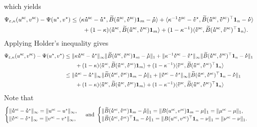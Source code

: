 which yields 
\begin{align*}
\Psi_{\varepsilon, \kappa} (u^{\text{sc}} ,v^{\text{sc}}) -\Psi(u^\star, v^\star)
&\leq  \inr{\kappa \dt{u}^{\text{sc}} - \dt{u}^{\star}, \widetilde{B}(\dt{u}^{\text{sc}} ,\dt{v}^{\text{sc}})\mathbf 1_m - \dt{\mu}} +\inr{\kappa^{-1}\dt{v}^{\text{sc}} - \dt{v}^{\star}, \widetilde{B}(\dt{u}^{\text{sc}} ,\dt{v}^{\text{sc}})^\top\mathbf 1_n - \dt{\nu}}\\
&\qquad + (1- \kappa)\inr{\dt{u}^{\text{sc}} ,\widetilde{B}(\dt{u}^{\text{sc}} ,\dt{v}^{\text{sc}})\mathbf 1_m} + (1- \kappa^{-1})\inr{\dt{v}^{\text{sc}} ,\widetilde{B}(\dt{u}^{\text{sc}} ,\dt{v}^{\text{sc}})^\top\mathbf 1_n}.
\end{align*}
Applying Holder's inequality gives 
\begin{align*}
\Psi_{\varepsilon, \kappa}(u^{\text{sc}} ,v^{\text{sc}}) -\Psi(u^\star, v^\star)
&\leq \norm{\kappa \dt{u}^{\text{sc}} - \dt{u}^\star}_\infty \norm{\widetilde{B}(\dt{u}^{\text{sc}} ,\dt{v}^{\text{sc}})\mathbf 1_m - \dt{\mu}}_1 + \norm{\kappa^{-1}\dt{v}^{\text{sc}} - \dt{v}^\star}_\infty \norm{\widetilde{B}(\dt{u}^{\text{sc}} ,\dt{v}^{\text{sc}})^\top\mathbf 1_n - \dt{\nu}}_1\\
&\qquad + (1- \kappa)\inr{\dt{u}^{\text{sc}} ,\widetilde{B}(\dt{u}^{\text{sc}} ,\dt{v}^{\text{sc}})\mathbf 1_m} + (1- \kappa^{-1})\inr{\dt{v}^{\text{sc}} ,\widetilde{B}(\dt{u}^{\text{sc}} ,\dt{v}^{\text{sc}})^\top\mathbf 1_n}\\
&\leq \norm{\dt{u}^{\text{sc}} - \dt{u}^\star}_\infty \norm{\widetilde{B}(\dt{u}^{\text{sc}} ,\dt{v}^{\text{sc}})\mathbf 1_m - \dt{\mu}}_1 + \norm{\dt{v}^{\text{sc}} - \dt{v}^\star}_\infty \norm{\widetilde{B}(\dt{u}^{\text{sc}} ,\dt{v}^{\text{sc}})^\top\mathbf 1_n - \dt{\nu}}_1\\
&\qquad + (1- \kappa)\inr{\dt{u}^{\text{sc}} ,\widetilde{B}(\dt{u}^{\text{sc}} ,\dt{v}^{\text{sc}})\mathbf 1_m} + (1- \kappa^{-1})\inr{\dt{v}^{\text{sc}} ,\widetilde{B}(\dt{u}^{\text{sc}} ,\dt{v}^{\text{sc}})^\top\mathbf 1_n}\\
\end{align*}
Note that
\begin{align*}
\begin{cases}
\norm{\dt{u}^{\text{sc}} - \dt{u}^\star}_\infty = \norm{{u}^{\text{sc}} - {u}^\star}_\infty,\\
\norm{\dt{v}^{\text{sc}} - \dt{v}^\star}_\infty = \norm{{v}^{\text{sc}} - {v}^\star}_\infty,
\end{cases}
\text{ and }
\begin{cases}
\norm{\widetilde{B}(\dt{u}^{\text{sc}} ,\dt{v}^{\text{sc}})\mathbf 1_m - \dt{\mu}}_1 = \norm{{B}({u}^{\text{sc}} ,{v}^{\text{sc}})\mathbf 1_m - {\mu}}_1 = \norm{\mu^{\text{sc}} - \mu}_1,\\
\norm{\widetilde{B}(\dt{u}^{\text{sc}} ,\dt{v}^{\text{sc}})^\top\mathbf 1_n - \dt{\nu}}_1 = \norm{{B}({u}^{\text{sc}} ,{v}^{\text{sc}})^\top\mathbf 1_n - {\nu}}_1 = \norm{\nu^{\text{sc}} - \nu}_1.
\end{cases}
\end{align*}
